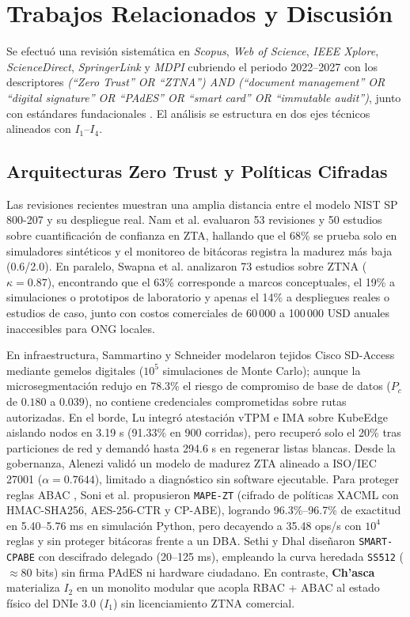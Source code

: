 \documentclass[runningheads,twocolumn]{llncs}
\begin{document}
\section{Trabajos Relacionados y Discusión}\label{sec:related}

Se efectuó una revisión sistemática en \textit{Scopus}, \textit{Web of Science}, \textit{IEEE Xplore}, \textit{ScienceDirect}, \textit{SpringerLink} y \textit{MDPI} cubriendo el periodo 2022--2027 con los descriptores \textit{(``Zero Trust'' OR ``ZTNA'') AND (``document management'' OR ``digital signature'' OR ``PAdES'' OR ``smart card'' OR ``immutable audit'')}, junto con estándares fundacionales \cite{rose2020,hu2014,etsi2024,iso32000,iso27001}. El análisis se estructura en dos ejes técnicos alineados con $I_1$--$I_4$.

\subsection{Arquitecturas Zero Trust y Políticas Cifradas}
Las revisiones recientes muestran una amplia distancia entre el modelo NIST SP 800-207 \cite{rose2020} y su despliegue real. Nam et al. \cite{nam2026} evaluaron 53 revisiones y 50 estudios sobre cuantificación de confianza en ZTA, hallando que el 68\% se prueba solo en simuladores sintéticos y el monitoreo de bitácoras registra la madurez más baja (0.6/2.0). En paralelo, Swapna et al. \cite{swapna2026} analizaron 73 estudios sobre ZTNA ($\kappa = 0.87$), encontrando que el 63\% corresponde a marcos conceptuales, el 19\% a simulaciones o prototipos de laboratorio y apenas el 14\% a despliegues reales o estudios de caso, junto con costos comerciales de 60\,000 a 100\,000 USD anuales inaccesibles para ONG locales.

En infraestructura, Sammartino y Schneider \cite{sammartino2026} modelaron tejidos Cisco SD-Access mediante gemelos digitales ($10^5$ simulaciones de Monte Carlo); aunque la microsegmentación redujo en 78.3\% el riesgo de compromiso de base de datos ($P_c$ de $0.180$ a $0.039$), no contiene credenciales comprometidas sobre rutas autorizadas. En el borde, Lu \cite{lu2027} integró atestación vTPM e IMA sobre KubeEdge aislando nodos en 3.19 s (91.33\% en 900 corridas), pero recuperó solo el 20\% tras particiones de red y demandó hasta 294.6 s en regenerar listas blancas. Desde la gobernanza, Alenezi \cite{alenezi2026} validó un modelo de madurez ZTA alineado a ISO/IEC 27001 \cite{iso27001} ($\alpha = 0.7644$), limitado a diagnóstico sin software ejecutable. Para proteger reglas ABAC \cite{hu2014}, Soni et al. \cite{soni2026} propusieron \texttt{MAPE-ZT} (cifrado de políticas XACML con HMAC-SHA256, AES-256-CTR y CP-ABE), logrando 96.3\%--96.7\% de exactitud en 5.40--5.76 ms en simulación Python, pero decayendo a 35.48 ops/s con $10^4$ reglas y sin proteger bitácoras frente a un DBA. Sethi y Dhal \cite{sethi2026} diseñaron \texttt{SMART-CPABE} con descifrado delegado (20--125 ms), empleando la curva heredada \texttt{SS512} ($\approx 80$ bits) sin firma PAdES ni hardware ciudadano. En contraste, \textbf{Ch'asca} materializa $I_2$ en un monolito modular que acopla RBAC + ABAC al estado físico del DNIe 3.0 ($I_1$) sin licenciamiento ZTNA comercial.
\end{document}
